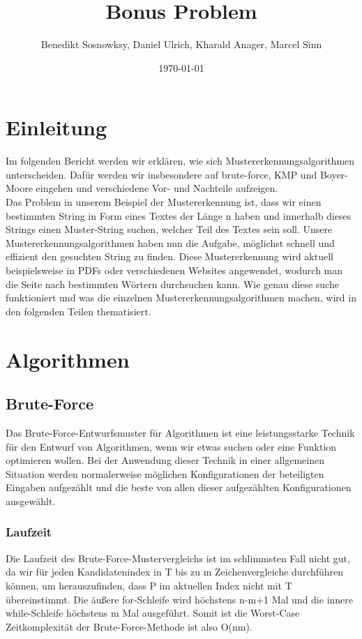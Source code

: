 \documentclass[14pt]{article}
\title{Bonus Problem}
\author{Benedikt Sosnowksy, Daniel Ulrich, Kharald Anager, Marcel Sinn}
\date{\today}
\begin{document}
\maketitle


\section{Einleitung}
Im folgenden Bericht werden wir erklären, wie sich Mustererkennungsalgorithmen unterscheiden. Dafür werden wir insbesondere auf brute-force, KMP und Boyer-Moore eingehen und verschiedene Vor- und Nachteile aufzeigen.\\

Das Problem in unserem Beispiel der Mustererkennung ist, dass wir einen bestimmten String in Form eines Textes der Länge n haben und innerhalb dieses Strings einen Muster-String suchen, welcher Teil des Textes sein soll. Unsere Mustererkennungsalgorithmen haben nun die Aufgabe, möglichst schnell und effizient den gesuchten String zu finden. Diese Mustererkennung wird aktuell beispielsweise in PDFs oder verschiedenen Websites angewendet, wodurch man die Seite nach bestimmten Wörtern durchsuchen kann. Wie genau diese suche funktioniert und was die einzelnen Mustererkennungsalgorithmen machen, wird in den folgenden Teilen thematisiert.

\section{Algorithmen}
\subsection{Brute-Force}

Das Brute-Force-Entwurfsmuster für Algorithmen ist eine leistungsstarke Technik für den Entwurf von Algorithmen, wenn wir etwas suchen oder eine Funktion optimieren wollen. Bei der Anwendung dieser Technik in einer allgemeinen Situation werden normalerweise möglichen Konfigurationen der beteiligten Eingaben aufgezählt und die beste von allen dieser aufgezählten Konfigurationen ausgewählt.

\subsubsection{Laufzeit}
Die Laufzeit des Brute-Force-Mustervergleichs ist im schlimmsten Fall nicht gut, da wir für jeden Kandidatenindex in T bis zu m Zeichenvergleiche durchführen können, um herauszufinden, dass P im aktuellen Index nicht mit T übereinstimmt. Die äußere for-Schleife wird höchstens n-m+1 Mal und die innere while-Schleife höchstens m Mal ausgeführt. Somit ist die Worst-Case Zeitkomplexität der Brute-Force-Methode ist also O(nm).
\end{document}
